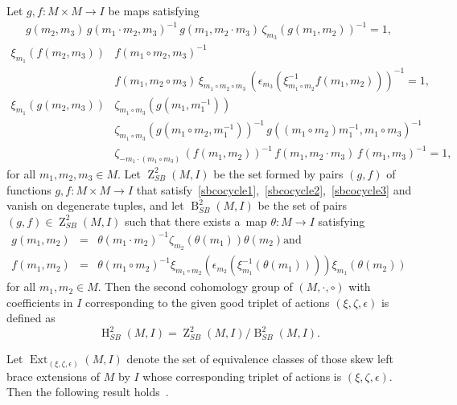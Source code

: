 \documentclass{jonasart}
\theoremstyle{plain}
\DeclareMathOperator{\B}{B}
\DeclareMathOperator{\Ext}{Ext}
\DeclareMathOperator{\Ho}{H}
\DeclareMathOperator{\Z}{Z}
\begin{document}
	Let $g,f: M \times M \rightarrow I$ be maps satisfying
	\begin{gather}
		g(m_2, m_3 ) \, g(m_1 \cdot m_2, m_3 )^{-1} \, g(m_1, m_2 \cdot m_3 ) \, \zeta_{m_3}(g(m_1, m_2 ))^{-1} = 1, \label{sbcocycle1}
	\end{gather}
	\begin{align}
		\xi_{m_1}(f(m_2, m_3 )){ }&{ }f(m_1 \circ m_2, m_3 )^{-1} \nonumber \\ &{ }f(m_1, m_2 \circ m_3 ) \, \xi_{m_1 \circ m_2 \circ m_3} \, (\epsilon_{m_3}(\xi^{-1}_{m_1 \circ m_2}f(m_1, m_2 )))^{-1} = 1, \label{sbcocycle2}
	\end{align}
	\begin{align}
		\xi_{m_1}(g(m_2, m_3 )){ }&{ }\zeta_{m_1 \circ m_3} (g(m_1, m^{-1}_1 )) \nonumber \\
		&{ } \zeta_{m_1 \circ m_3} (g(m_1 \circ m_2, m^{-1}_1 ))^{-1} \, g((m_1 \circ m_2 ) m^{-1}_1, m_1 \circ m_3 )^{-1} \nonumber \\
		&{ } \zeta_{- m_1\cdot (m_1 \circ m_3 )} \, (f(m_1, m_2 ))^{-1} \, f(m_1, m_2 \cdot m_3 ) \, f(m_1, m_3 )^{-1} = 1, \label{sbcocycle3}
	\end{align}
	for all $m_1, m_2, m_3 \in M$. Let $\Z_{SB}^2 (M, I)$ be the set formed by pairs $(g,f)$ of functions $g,f: M \times M \rightarrow I$ that satisfy~\eqref{sbcocycle1},~\eqref{sbcocycle2},~\eqref{sbcocycle3} and vanish on degenerate tuples, and let $\B_{SB}^2 (M, I)$ be the set of pairs $(g, f) \in \Z_{SB}^2 (M, I)$ such that there exists a~map $\theta:M \to I$ satisfying
	\begin{eqnarray}
		g(m_1, m_2 ) &=&\theta(m_1\cdot m_2 )^{-1} \zeta_{m_2}(\theta(m_1 ))\theta(m_2 ) \label{boundary con sb1} \textrm{and}\\
		f(m_1, m_2 ) &=& \theta(m_1\circ m_2 )^{-1}\xi_{m_1\circ m_2} (\epsilon_{m_2}(\xi^{-1}_{m_1}(\theta(m_1 ))))\xi_{m_1}(\theta(m_2 )) \label{boundary con sb2}
	\end{eqnarray}
	for all $m_1, m_2 \in M$. Then the second cohomology group of $(M, \cdot, \circ)$ with coefficients in $I$ corresponding to the given good triplet of actions $(\xi, \zeta, \epsilon)$ is defined as
	\[
	\Ho^2_{SB}(M, I) =  \Z_{SB}^2(M, I)/\B_{SB}^2(M, I).
	\]
	
	Let $\Ext_{(\xi, \zeta, \epsilon)}(M, I)$ denote the set of equivalence classes of those skew left brace extensions of $M$ by $I$ whose corresponding triplet of actions is $(\xi, \zeta, \epsilon)$. Then the following result holds~\cite[Theorem A]{MR4604853}.
	
\end{document}
